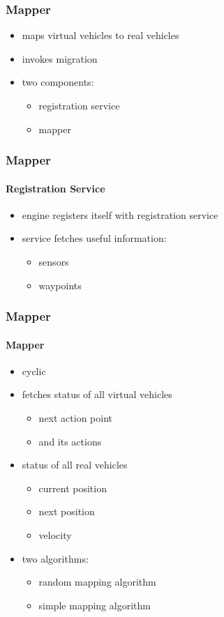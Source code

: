 \documentclass{beamer}
\begin{document}
\begin{frame}\frametitle{Mapper}
	\begin{itemize}
		\item maps virtual vehicles to real vehicles 
		\item invokes migration
		\item two components:
			\begin{itemize}
				\item registration service
				\item mapper
			\end{itemize}
	\end{itemize} 
\end{frame}

\begin{frame}\frametitle{Mapper}\framesubtitle{Registration Service}
	\begin{itemize}
		\item engine registers itself with registration service
		\item service fetches useful information:
		\begin{itemize}
			\item sensors
			\item waypoints
		\end{itemize}
	\end{itemize} 
\end{frame}

\begin{frame}\frametitle{Mapper}\framesubtitle{Mapper}
	\begin{itemize}
		\item cyclic
		\item fetches status of all virtual vehicles
		\begin{itemize}
			\item next action point
			\item and its actions
		\end{itemize}
		\item status of all real vehicles
		\begin{itemize}
			\item current position
			\item next position
			\item velocity
		\end{itemize}
		\item two algorithms:
		\begin{itemize}
			\item random mapping algorithm
			\item simple mapping algorithm
		\end{itemize}
	\end{itemize} 
\end{frame}
\end{document}

